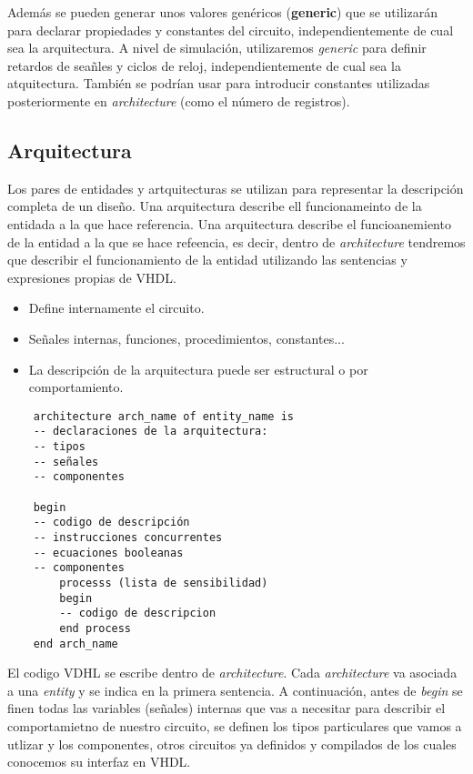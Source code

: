 Además se pueden generar unos valores genéricos (\textbf{generic}) que se utilizarán para declarar propiedades y constantes del circuito, independientemente de cual sea la arquitectura. A nivel de simulación, utilizaremos \textit{generic} para definir retardos de seañles y ciclos de reloj, independientemente de cual sea la atquitectura. También se podrían usar para introducir constantes utilizadas posteriormente en \textit{architecture} (como el número de registros). 

\subsection{Arquitectura}

Los pares de entidades y artquitecturas se utilizan para representar la descripción completa de un diseño. Una arquitectura describe ell funcionameinto de la entidada a la que hace referencia. Una arquitectura describe el funcioanemiento de la entidad a la que se hace refeencia, es decir, dentro de \textit{architecture} tendremos que describir el funcionamiento de la entidad utilizando las sentencias y expresiones propias de VHDL. 

\begin{itemize}
    \item Define internamente el circuito. 
    \item Señales internas, funciones, procedimientos, constantes...
    \item La descripción de la arquitectura puede ser estructural o por comportamiento. 
\end{itemize}

\begin{lstlisting}
    architecture arch_name of entity_name is 
    -- declaraciones de la arquitectura: 
    -- tipos 
    -- señales
    -- componentes

    begin 
    -- codigo de descripción
    -- instrucciones concurrentes 
    -- ecuaciones booleanas
    -- componentes
        processs (lista de sensibilidad)
        begin 
        -- codigo de descripcion
        end process
    end arch_name
\end{lstlisting}
El codigo VDHL se escribe dentro de \textit{architecture}. Cada \textit{architecture} va asociada a una \textit{entity} y se indica en la primera sentencia. A continuación, antes de \textit{begin} se finen todas las variables (señales) internas que vas a necesitar para describir el comportamietno de nuestro circuito, se definen los tipos particulares que vamos a utlizar y los componentes, otros circuitos ya definidos y compilados de los cuales conocemos su interfaz en VHDL.

